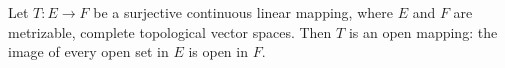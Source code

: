 Let $T: E \to F$ be a surjective continuous linear mapping, where $E$ and $F$ are metrizable, complete topological vector spaces. Then $T$ is an open mapping: the image of every open set in $E$ is open in $F$.
